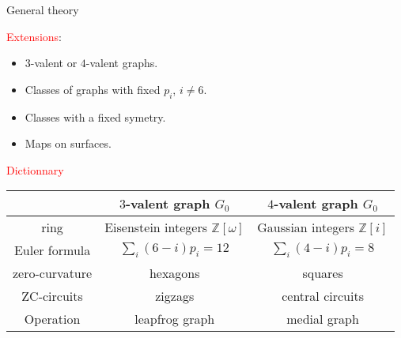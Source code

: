 \documentclass[%
pdf,
colorBG,
slideColor,
]{prosper}
\newcommand{\ZZ}{\ensuremath{\mathbb{Z}}}
\begin{document}
\begin{slide}{General theory}
\begin{center}
\textcolor{red}{Extensions}:
\end{center}
\begin{itemize}
\item $3$-valent or $4$-valent graphs.
\item Classes of graphs with fixed $p_i$, $i\not= 6$.
\item Classes with a fixed symetry.
\item Maps on surfaces.
\end{itemize}
\begin{center}
\textcolor{red}{Dictionnary}
\end{center}
\begin{center}
{\tiny
\begin{tabular}{||c|c|c||}
\hline
\hline
               &$3$-valent graph $G_0$           &$4$-valent graph $G_0$\\
\hline
ring           &Eisenstein integers $\ZZ[\omega]$ &Gaussian integers $\ZZ[i]$\\
Euler formula  &$\sum_{i} (6-i)p_i=12$           &$\sum_{i} (4-i)p_i=8$\\
zero-curvature &hexagons                         &squares\\
ZC-circuits    &zigzags                          &central circuits\\
Operation      &leapfrog graph                   &medial graph\\
\hline
\hline
\end{tabular}
}
\end{center}






\end{slide}
\end{document}
